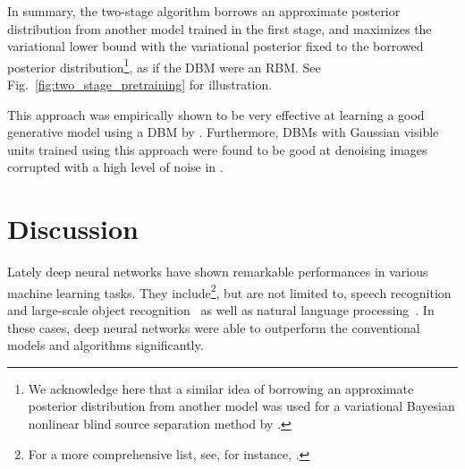 \documentclass{now}
\begin{document}
In summary, the two-stage algorithm borrows an approximate posterior
distribution from another model trained in the first stage, and maximizes the
variational lower bound with the variational posterior fixed to the borrowed
posterior distribution\footnote{
    We acknowledge here that a similar idea of borrowing an approximate
    posterior distribution from another model was used for a variational
    Bayesian nonlinear blind source separation method by \citet{Honkela2004}.
}, as if the DBM were an RBM. See Fig.~\ref{fig:two_stage_pretraining} for
illustration.

This approach was empirically shown to be very effective at learning a good
generative model using a DBM by \citet{Cho13ICANN}. Furthermore, DBMs with
Gaussian visible units trained using this approach were found to be good at
denoising images corrupted with a high level of noise in \citep{Cho13ICANN2}.













\chapter{Discussion}
\label{chap:discussion}

Lately deep neural networks have shown remarkable performances in various
machine learning tasks. They include\footnote{
    For a more comprehensive list, see, for instance,
    \citep{Bengio2013pami,Schmidhuber2014}.  
}, but are not limited to, speech recognition~\citep[see,
e.g.,][]{Hinton2012sp,Dahl2012} and large-scale object recognition~\citep[see,
e.g.,][]{Goodfellow2013,Krizhevsky2012,Hinton2012} as well as natural language
processing~\citep[see, e.g.,][]{Socher2011,Schwenk2012}. In these cases,
deep neural networks were able to outperform the conventional models and
algorithms significantly.
\end{document}
